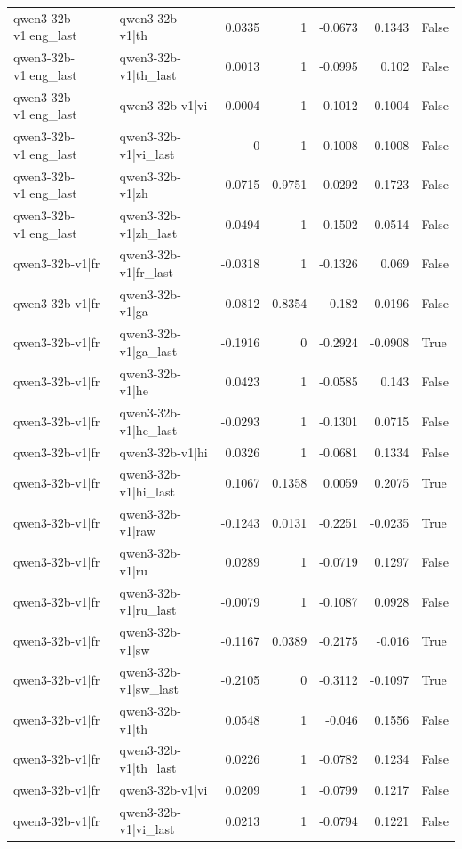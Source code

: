 \begin{table}
\begin{tabular}{l l r r r r l}
qwen3-32b-v1|eng_last & qwen3-32b-v1|th & 0.0335 & 1 & -0.0673 & 0.1343 & False \\
qwen3-32b-v1|eng_last & qwen3-32b-v1|th_last & 0.0013 & 1 & -0.0995 & 0.102 & False \\
qwen3-32b-v1|eng_last & qwen3-32b-v1|vi & -0.0004 & 1 & -0.1012 & 0.1004 & False \\
qwen3-32b-v1|eng_last & qwen3-32b-v1|vi_last & 0 & 1 & -0.1008 & 0.1008 & False \\
qwen3-32b-v1|eng_last & qwen3-32b-v1|zh & 0.0715 & 0.9751 & -0.0292 & 0.1723 & False \\
qwen3-32b-v1|eng_last & qwen3-32b-v1|zh_last & -0.0494 & 1 & -0.1502 & 0.0514 & False \\
qwen3-32b-v1|fr & qwen3-32b-v1|fr_last & -0.0318 & 1 & -0.1326 & 0.069 & False \\
qwen3-32b-v1|fr & qwen3-32b-v1|ga & -0.0812 & 0.8354 & -0.182 & 0.0196 & False \\
qwen3-32b-v1|fr & qwen3-32b-v1|ga_last & -0.1916 & 0 & -0.2924 & -0.0908 & True \\
qwen3-32b-v1|fr & qwen3-32b-v1|he & 0.0423 & 1 & -0.0585 & 0.143 & False \\
qwen3-32b-v1|fr & qwen3-32b-v1|he_last & -0.0293 & 1 & -0.1301 & 0.0715 & False \\
qwen3-32b-v1|fr & qwen3-32b-v1|hi & 0.0326 & 1 & -0.0681 & 0.1334 & False \\
qwen3-32b-v1|fr & qwen3-32b-v1|hi_last & 0.1067 & 0.1358 & 0.0059 & 0.2075 & True \\
qwen3-32b-v1|fr & qwen3-32b-v1|raw & -0.1243 & 0.0131 & -0.2251 & -0.0235 & True \\
qwen3-32b-v1|fr & qwen3-32b-v1|ru & 0.0289 & 1 & -0.0719 & 0.1297 & False \\
qwen3-32b-v1|fr & qwen3-32b-v1|ru_last & -0.0079 & 1 & -0.1087 & 0.0928 & False \\
qwen3-32b-v1|fr & qwen3-32b-v1|sw & -0.1167 & 0.0389 & -0.2175 & -0.016 & True \\
qwen3-32b-v1|fr & qwen3-32b-v1|sw_last & -0.2105 & 0 & -0.3112 & -0.1097 & True \\
qwen3-32b-v1|fr & qwen3-32b-v1|th & 0.0548 & 1 & -0.046 & 0.1556 & False \\
qwen3-32b-v1|fr & qwen3-32b-v1|th_last & 0.0226 & 1 & -0.0782 & 0.1234 & False \\
qwen3-32b-v1|fr & qwen3-32b-v1|vi & 0.0209 & 1 & -0.0799 & 0.1217 & False \\
qwen3-32b-v1|fr & qwen3-32b-v1|vi_last & 0.0213 & 1 & -0.0794 & 0.1221 & False \\

\end{tabular}
\end{table}
